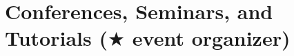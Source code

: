 \documentclass[11pt,a4paper,sans]{moderncv}        %
\begin{document}




\section{Conferences, Seminars, and Tutorials {\small ($\bigstar$ event organizer)}}
\end{document}

